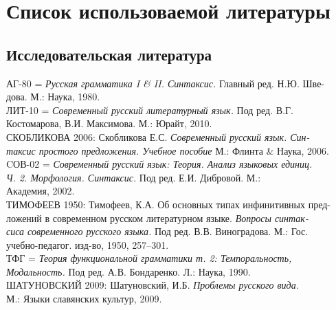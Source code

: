 \newcommand{\indenttext}{\hspace*{4ex}}
\newcommand{\cutline}{\\\indenttext}
\newcommand{\cutword}{-\cutline}

\section*{Список использоваемой литературы}
\setlength{\parindent}{0cm}
\begin{normalsize}
\subsection*{Исследовательская литература}
АГ-80 = \textit{Русская грамматика I \& II. Синтаксис.} Главный ред. Н.Ю. Шве\cutword дова. М.: Наука, 1980.\\
ЛИТ-10 = \textit{Современный русский литературный язык.} Под ред. В.Г.\cutline Костомарова, В.И. Максимова. М.: Юрайт, 2010.\\
СКОБЛИКОВА 2006: Скобликова Е.С. \textit{Современный русский язык. Син\cutword таксис простого предложения. Учебное пособие} М.: Флинта \& Наука, \indenttext 2006.\\
CОВ-02 = \textit{Современный русский язык: Теория. Анализ языковых единиц.\cutline Ч. 2. Морфология. Синтаксис.} Под ред. Е.И. Дибровой. М.:\cutline Академия, 2002.\\
ТИМОФЕЕВ 1950: Тимофеев, К.А. Об основных типах инфинитивных пред-\indenttext ложений в современном русском литературном языке. \textit{Вопросы синтак\cutword сиса современного русского языка.} Под ред. В.В. Виноградова. М.: Гос.\cutline учебно-педагог. изд-во, 1950, 257--301.\\
ТФГ = \textit{Теория функциональной грамматики т. 2: Темпоральность, \cutline Модальность.} Под ред. А.В. Бондаренко. Л.: Наука, 1990.\\
ШАТУНОВСКИЙ 2009: Шатуновский, И.Б. \textit{Проблемы русского вида.} \cutline М.: Языки славянских культур, 2009.
\end{normalsize}